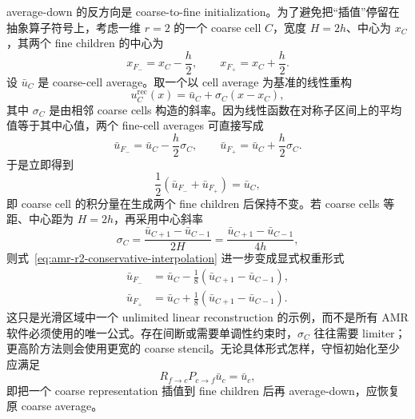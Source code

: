 average-down 的反方向是 coarse-to-fine initialization。为了避免把“插值”停留在抽象算子符号上，考虑一维 $r=2$ 的一个 coarse cell $C$，宽度 $H=2h$、中心为 $x_C$，其两个 fine children 的中心为
\begin{equation}
 x_{F_-}=x_C-\frac h2,
 \qquad
 x_{F_+}=x_C+\frac h2.
\end{equation}
设 $\bar u_C$ 是 coarse-cell average。取一个以 cell average 为基准的线性重构
\begin{equation}
 u_C^{\mathrm{rec}}(x)
 =\bar u_C+\sigma_C(x-x_C),
\label{eq:amr-conservative-linear-reconstruction}
\end{equation}
其中 $\sigma_C$ 是由相邻 coarse cells 构造的斜率。因为线性函数在对称子区间上的平均值等于其中心值，两个 fine-cell averages 可直接写成
\begin{equation}
\boxed{
\bar u_{F_-}
=\bar u_C-\frac h2\sigma_C,
\qquad
\bar u_{F_+}
=\bar u_C+\frac h2\sigma_C.
}
\label{eq:amr-r2-conservative-interpolation}
\end{equation}
于是立即得到
\begin{equation}
\frac12\left(\bar u_{F_-}+\bar u_{F_+}\right)
=\bar u_C,
\label{eq:amr-r2-conservative-interpolation-check}
\end{equation}
即 coarse cell 的积分量在生成两个 fine children 后保持不变。若 coarse cells 等距、中心距为 $H=2h$，再采用中心斜率
\begin{equation}
\sigma_C
=\frac{\bar u_{C+1}-\bar u_{C-1}}{2H}
=\frac{\bar u_{C+1}-\bar u_{C-1}}{4h},
\end{equation}
则式~\eqref{eq:amr-r2-conservative-interpolation} 进一步变成显式权重形式
\begin{equation}
\boxed{
\begin{aligned}
\bar u_{F_-}
&=\bar u_C
-\frac18\left(\bar u_{C+1}-\bar u_{C-1}\right),\\
\bar u_{F_+}
&=\bar u_C
+\frac18\left(\bar u_{C+1}-\bar u_{C-1}\right).
\end{aligned}
}
\label{eq:amr-r2-conservative-interpolation-explicit}
\end{equation}
这只是光滑区域中一个 unlimited linear reconstruction 的示例，而不是所有 AMR 软件必须使用的唯一公式。存在间断或需要单调性约束时，$\sigma_C$ 往往需要 limiter；更高阶方法则会使用更宽的 coarse stencil。无论具体形式怎样，守恒初始化至少应满足
\begin{equation}
\boxed{
R_{f\rightarrow c}P_{c\rightarrow f}\bar u_c
=\bar u_c,
}
\label{eq:amr-rp-identity}
\end{equation}
即把一个 coarse representation 插值到 fine children 后再 average-down，应恢复原 coarse average。

